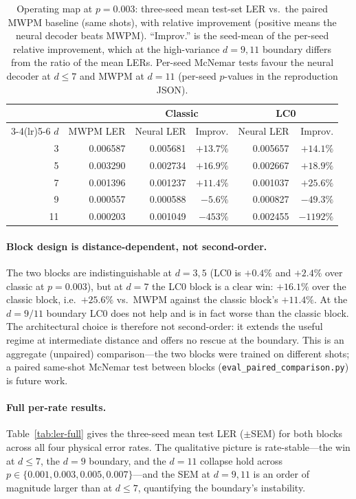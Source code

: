 \documentclass[11pt,a4paper]{article}
\begin{document}
\begin{table}[htbp]
\centering
\caption{Operating map at $p=0.003$: three-seed mean test-set LER vs.\ the
paired MWPM baseline (same shots), with relative improvement (positive
means the neural decoder beats MWPM). ``Improv.'' is the seed-mean of the
per-seed relative improvement, which at the high-variance $d=9,11$ boundary
differs from the ratio of the mean LERs. Per-seed McNemar tests favour the
neural decoder at $d\le7$ and MWPM at $d=11$ (per-seed $p$-values in the
reproduction JSON).}
\label{tab:boundary}
\begin{tabular}{@{}rrrrrr@{}}
\toprule
 & & \multicolumn{2}{c}{Classic} & \multicolumn{2}{c}{LC0} \\
\cmidrule(lr){3-4}\cmidrule(lr){5-6}
$d$ & MWPM LER & Neural LER & Improv. & Neural LER & Improv. \\
\midrule
3  & 0.006587 & 0.005681 & $+13.7\%$ & 0.005657 & $+14.1\%$ \\
5  & 0.003290 & 0.002734 & $+16.9\%$ & 0.002667 & $+18.9\%$ \\
7  & 0.001396 & 0.001237 & $+11.4\%$ & 0.001037 & $+25.6\%$ \\
9  & 0.000557 & 0.000588 & $-5.6\%$  & 0.000827 & $-49.3\%$ \\
11 & 0.000203 & 0.001049 & $-453\%$  & 0.002455 & $-1192\%$ \\
\bottomrule
\end{tabular}
\end{table}

\paragraph{Block design is distance-dependent, not second-order.}
The two blocks are indistinguishable at $d=3,5$ (LC0 is $+0.4\%$ and
$+2.4\%$ over classic at $p=0.003$), but at $d=7$ the LC0 block is a clear
win: $+16.1\%$ over the classic block, i.e.\ $+25.6\%$ vs.\ MWPM against
the classic block's $+11.4\%$. At the $d=9/11$ boundary LC0 does not help
and is in fact worse than the classic block. The architectural choice is
therefore not second-order: it extends the useful regime at intermediate
distance and offers no rescue at the boundary. This is an aggregate
(unpaired) comparison---the two blocks were trained on different shots; a
paired same-shot McNemar test between blocks
(\texttt{eval\_paired\_comparison.py}) is future work.

\paragraph{Full per-rate results.}
Table~\ref{tab:ler-full} gives the three-seed mean test LER ($\pm$SEM) for
both blocks across all four physical error rates. The qualitative picture
is rate-stable---the win at $d\le7$, the $d=9$ boundary, and the $d=11$
collapse hold across $p\in\{0.001,0.003,0.005,0.007\}$---and the SEM at
$d=9,11$ is an order of magnitude larger than at $d\le7$, quantifying the
boundary's instability.
\end{document}
